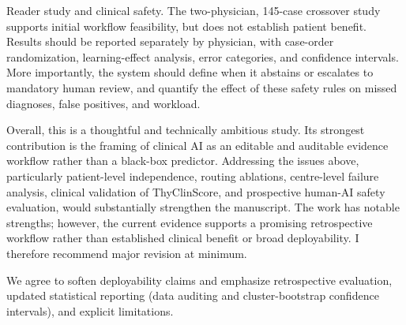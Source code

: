 \label{rev:R1.6}
\begin{reviewercomment}
Reader study and clinical safety. The two-physician, 145-case crossover study supports initial workflow feasibility, but does not establish patient benefit. Results should be reported separately by physician, with case-order randomization, learning-effect analysis, error categories, and confidence intervals. More importantly, the system should define when it abstains or escalates to mandatory human review, and quantify the effect of these safety rules on missed diagnoses, false positives, and workload.
\end{reviewercomment}
\begin{authorresponse}

\end{authorresponse}




\begin{reviewercomment}
Overall, this is a thoughtful and technically ambitious study. Its strongest contribution is the framing of clinical AI as an editable and auditable evidence workflow rather than a black-box predictor. Addressing the issues above, particularly patient-level independence, routing ablations, centre-level failure analysis, clinical validation of ThyClinScore, and prospective human-AI safety evaluation, would substantially strengthen the manuscript. The work has notable strengths; however, the current evidence supports a promising retrospective workflow rather than established clinical benefit or broad deployability. I therefore recommend major revision at minimum.
\end{reviewercomment}
\begin{authorresponse}
We agree to soften deployability claims and emphasize retrospective evaluation, updated statistical reporting (data auditing and cluster-bootstrap confidence intervals), and explicit limitations.\par

\end{authorresponse}

